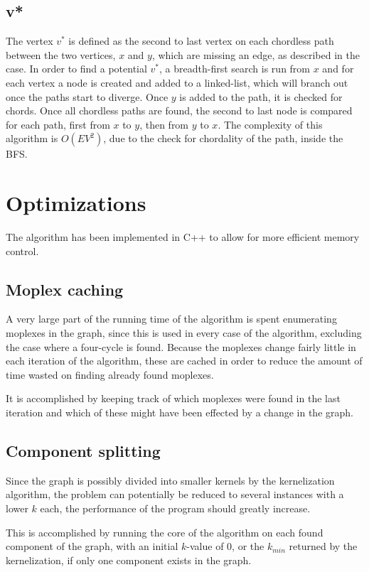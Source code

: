 \documentclass{article}
\begin{document}
		\subsection{v*}
		The vertex $v^*$ is defined as the second to last vertex on each chordless path between the two vertices, $x$ and $y$, which are missing an edge, as described in the case.
		In order to find a potential $v^*$, a breadth-first search is run from $x$ and for each vertex a node is created and added to a linked-list, which will branch out once the paths start to diverge.
		Once $y$ is added to the path, it is checked for chords.
		Once all chordless paths are found, the second to last node is compared for each path, first from $x$ to $y$, then from $y$ to $x$.
		The complexity of this algorithm is $O(EV^2)$, due to the check for chordality of the path, inside the BFS.

	\section{Optimizations}
	The algorithm has been implemented in C++ to allow for more efficient memory control.

		\subsection{Moplex caching}
		A very large part of the running time of the algorithm is spent enumerating moplexes in the graph, since this is used in every case of the algorithm, excluding the case where a four-cycle is found.
		Because the moplexes change fairly little in each iteration of the algorithm, these are cached in order to reduce the amount of time wasted on finding already found moplexes.

		It is accomplished by keeping track of which moplexes were found in the last iteration and which of these might have been effected by a change in the graph.

		\subsection{Component splitting}
		Since the graph is possibly divided into smaller kernels by the kernelization algorithm, the problem can potentially be reduced to several instances with a lower $k$ each, the performance of the program should greatly increase.

		This is accomplished by running the core of the algorithm on each found component of the graph, with an initial $k$-value of 0, or the $k_{min}$ returned by the kernelization, if only one component exists in the graph.
\end{document}
